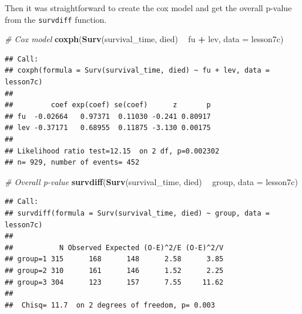 \documentclass[]{book}
\newenvironment{Shaded}{\begin{snugshade}}{\end{snugshade}}
\newcommand{\CommentTok}[1]{\textcolor[rgb]{0.56,0.35,0.01}{\textit{#1}}}
\newcommand{\DataTypeTok}[1]{\textcolor[rgb]{0.13,0.29,0.53}{#1}}
\newcommand{\DecValTok}[1]{\textcolor[rgb]{0.00,0.00,0.81}{#1}}
\newcommand{\KeywordTok}[1]{\textcolor[rgb]{0.13,0.29,0.53}{\textbf{#1}}}
\newcommand{\NormalTok}[1]{#1}
\newcommand{\OperatorTok}[1]{\textcolor[rgb]{0.81,0.36,0.00}{\textbf{#1}}}
\newcommand{\StringTok}[1]{\textcolor[rgb]{0.31,0.60,0.02}{#1}}
\begin{document}
\begin{Shaded}
\end{Shaded}

Then it was straightforward to create the cox model and get the overall
p-value from the \texttt{survdiff} function.

\begin{Shaded}
\begin{Highlighting}[]
\CommentTok{# Cox model}
\KeywordTok{coxph}\NormalTok{(}\KeywordTok{Surv}\NormalTok{(survival_time, died) }\OperatorTok{~}\StringTok{ }\NormalTok{fu }\OperatorTok{+}\StringTok{ }\NormalTok{lev, }\DataTypeTok{data =}\NormalTok{ lesson7c)}
\end{Highlighting}
\end{Shaded}

\begin{verbatim}
## Call:
## coxph(formula = Surv(survival_time, died) ~ fu + lev, data = lesson7c)
## 
##         coef exp(coef) se(coef)      z       p
## fu  -0.02664   0.97371  0.11030 -0.241 0.80917
## lev -0.37171   0.68955  0.11875 -3.130 0.00175
## 
## Likelihood ratio test=12.15  on 2 df, p=0.002302
## n= 929, number of events= 452
\end{verbatim}

\begin{Shaded}
\begin{Highlighting}[]
\CommentTok{# Overall p-value}
\KeywordTok{survdiff}\NormalTok{(}\KeywordTok{Surv}\NormalTok{(survival_time, died) }\OperatorTok{~}\StringTok{ }\NormalTok{group, }\DataTypeTok{data =}\NormalTok{ lesson7c)}
\end{Highlighting}
\end{Shaded}

\begin{verbatim}
## Call:
## survdiff(formula = Surv(survival_time, died) ~ group, data = lesson7c)
## 
##           N Observed Expected (O-E)^2/E (O-E)^2/V
## group=1 315      168      148      2.58      3.85
## group=2 310      161      146      1.52      2.25
## group=3 304      123      157      7.55     11.62
## 
##  Chisq= 11.7  on 2 degrees of freedom, p= 0.003
\end{verbatim}
\end{document}
